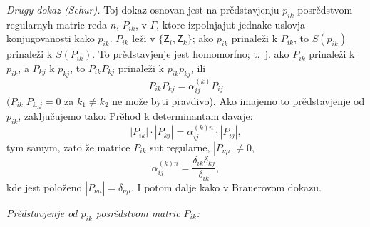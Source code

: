 \documentclass[11pt]{article}
\begin{document}
\emph{Drugy dokaz (Schur).} Toj dokaz osnovan jest na prědstavjenju \(p_{ik}\) posrědstvom regularnyh matric reda \(n\), \(P_{ik}\), v \(\Gamma\), ktore izpolnjajut jednake uslovja konjugovanosti kako \(p_{ik}\). \(P_{ik}\) leži v \(\{\mathsf{Z}_i,\mathsf{Z}_k\}\); ako \(p_{ik}\) prinaleži k \(P_{ik}\), to \(S(p_{ik})\) prinaleži k \(S(P_{ik})\). To prědstavjenje jest homomorfno; t.~j. ako \(P_{ik}\) prinaleži k \(p_{ik}\), a \(P_{kj}\) k \(p_{kj}\), to \(P_{ik}P_{kj}\) prinaleži k \(p_{ik}p_{kj}\), ili
\[
P_{ik}P_{kj}=\alpha_{ij}^{(k)}P_{ij}
\]
\((P_{ik_1}P_{k_2j}=0\) za \(k_1\neq k_2\) ne može byti pravdivo). Ako imajemo to prědstavjenje od \(p_{ik}\), zaključujemo tako: Prěhod k determinantam davaje:
\[
|P_{ik}|\cdot |P_{kj}|=\alpha_{ij}^{(k)n}\cdot |P_{ij}|,
\]
tym samym, zato že matrice \(P_{ik}\) sut regularne, \(|P_{\nu\mu}|\ne0\),
\[
\alpha_{ij}^{(k)n}=\frac{\delta_{ik}\delta_{kj}}{\delta_{ik}},
\]
kde jest položeno \(|P_{\nu\mu}|=\delta_{\nu\mu}\). I potom dalje kako v Brauerovom dokazu.

\emph{Prědstavjenje od \(p_{ik}\) posrědstvom matric \(P_{ik}\):}
\end{document}
